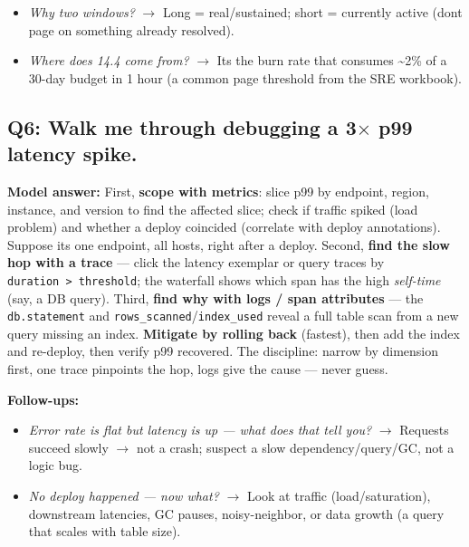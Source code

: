 \documentclass[11pt]{article}
\providecommand{\tightlist}{\setlength{\itemsep}{1pt}\setlength{\parskip}{0pt}}
\begin{document}
\begin{itemize}
\tightlist
\item
  \emph{Why two windows?} \(\rightarrow\) Long = real/sustained; short = currently active (don\textquotesingle t page on something already resolved).
\item
  \emph{Where does 14.4 come from?} \(\rightarrow\) It\textquotesingle s the burn rate that consumes \textasciitilde2\% of a 30-day budget in 1 hour (a common page threshold from the SRE workbook).
\end{itemize}

\subsection{\texorpdfstring{Q6: Walk me through debugging a 3\(\times\) p99 latency spike.}{Q6: Walk me through debugging a 3\textbackslash times p99 latency spike.}}\label{q6-walk-me-through-debugging-a-3times-p99-latency-spike}

\textbf{Model answer:} First, \textbf{scope with metrics}: slice p99 by endpoint, region, instance, and version to find the affected slice; check if traffic spiked (load problem) and whether a deploy coincided (correlate with deploy annotations). Suppose it\textquotesingle s one endpoint, all hosts, right after a deploy. Second, \textbf{find the slow hop with a trace} --- click the latency exemplar or query traces by \texttt{duration\ \textgreater{}\ threshold}; the waterfall shows which span has the high \emph{self-time} (say, a DB query). Third, \textbf{find why with logs / span attributes} --- the \texttt{db.statement} and \texttt{rows\_scanned}/\texttt{index\_used} reveal a full table scan from a new query missing an index. \textbf{Mitigate by rolling back} (fastest), then add the index and re-deploy, then verify p99 recovered. The discipline: narrow by dimension first, one trace pinpoints the hop, logs give the cause --- never guess.

\textbf{Follow-ups:}

\begin{itemize}
\tightlist
\item
  \emph{Error rate is flat but latency is up --- what does that tell you?} \(\rightarrow\) Requests succeed slowly \(\rightarrow\) not a crash; suspect a slow dependency/query/GC, not a logic bug.
\item
  \emph{No deploy happened --- now what?} \(\rightarrow\) Look at traffic (load/saturation), downstream latencies, GC pauses, noisy-neighbor, or data growth (a query that scales with table size).
\end{itemize}
\end{document}
